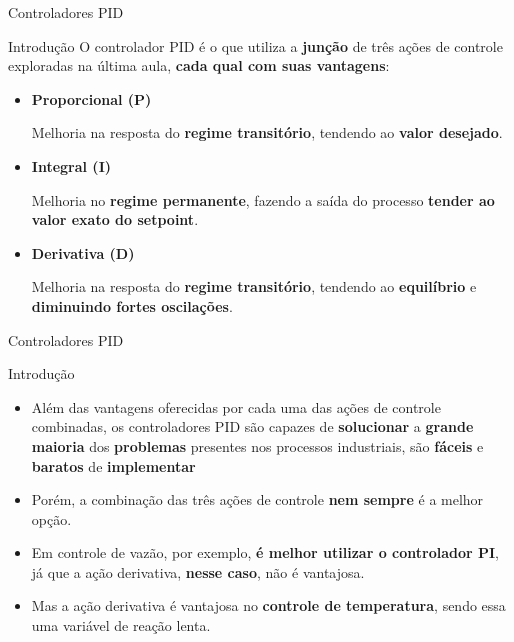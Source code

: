 \begin{frame}{Controladores PID}
	\begin{block}{Introdução}
		O controlador PID é o que utiliza a \textbf{junção} de três ações de controle exploradas na última aula, \textbf{cada qual com suas vantagens}:
		\begin{itemize}
			\item \textbf{Proporcional (P)}
			
			Melhoria na resposta do \textbf{regime transitório}, tendendo ao \textbf{valor desejado}.
			\item \textbf{Integral (I)}
			
			Melhoria no \textbf{regime permanente}, fazendo a saída do processo \textbf{tender ao valor exato do setpoint}.
			\item \textbf{Derivativa (D)}
			
			Melhoria na resposta do \textbf{regime transitório}, tendendo ao \textbf{equilíbrio} e \textbf{diminuindo fortes oscilações}.
		\end{itemize}
	\end{block}
\end{frame}


\begin{frame}{Controladores PID}
	\begin{block}{Introdução}
		\begin{itemize}
			\item Além das vantagens oferecidas por cada uma das ações de controle combinadas, os controladores PID são capazes de \textbf{solucionar} a \textbf{grande maioria} dos \textbf{problemas} presentes nos processos industriais, são \textbf{fáceis} e \textbf{baratos} de \textbf{implementar}
			\item Porém, a combinação das três ações de controle \textbf{nem sempre} é a melhor opção.
			\item Em controle de vazão, por exemplo, \textbf{é melhor utilizar o controlador PI}, já que a ação derivativa, \textbf{nesse caso}, não é vantajosa.
			\item Mas a ação derivativa é vantajosa no \textbf{controle de temperatura}, sendo essa uma variável de reação lenta.
		\end{itemize}
	\end{block}
\end{frame}


